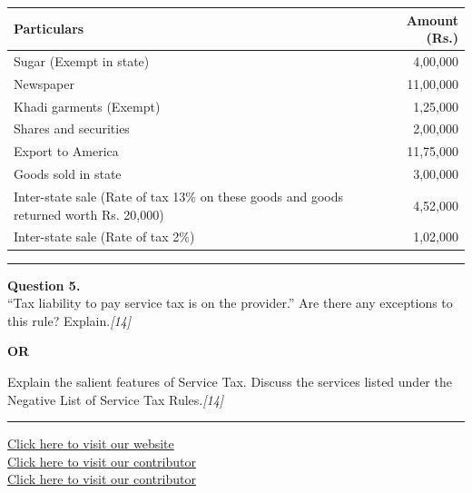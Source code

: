 \documentclass[11pt,a4paper]{article}
\newcommand{\pts}[1]{\hfill   \textit{[#1]}}
\begin{document}
\begin{center}
\renewcommand{\arraystretch}{1.1}

\begin{tabular}{lr}
  \hline
   \textbf{Particulars} &   \textbf{Amount (Rs.)} \\ \hline
  Sugar (Exempt in state) & 4,00,000 \\
  Newspaper & 11,00,000 \\
  Khadi garments (Exempt) & 1,25,000 \\
  Shares and securities & 2,00,000 \\
  Export to America & 11,75,000 \\
  Goods sold in state & 3,00,000 \\
  Inter-state sale (Rate of tax 13\% on these goods and goods returned worth Rs. 20,000) & 4,52,000 \\
  Inter-state sale (Rate of tax 2\%) & 1,02,000 \\ \hline
\end{tabular}
\end{center}

\medskip\rule{\linewidth}{0.2pt}




\noindent   \textbf{Question 5.} \\
``Tax liability to pay service tax is on the provider.'' Are there any exceptions to this rule? Explain.\pts{14}

\centerline{   \textbf{OR}}

Explain the salient features of Service Tax. Discuss the services listed under the Negative List of Service Tax Rules.\pts{14}

\vfill
\rule{\linewidth}{0.4pt}

\begin{center}\small
\href{https://bhu-exam.vercel.app/}{Click here to visit our website}\\[4pt]
\href{https://me-aryan.vercel.app/}{Click here to visit our contributor}\\[4pt]
\href{https://quashan-me.vercel.app/}{Click here to visit our contributor}
\end{center}
\end{document}

